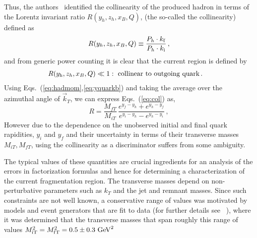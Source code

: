 \documentclass[final,3p,times,onecolumn,sort&compress,hidelinks]{elsarticle}
\newcommand{\xbj}{x_B}
\newcommand{\zh}{z_h}
\newcommand{\Tsc}[2]{#1_{#2\text{T}}}
\newcommand{\initq}{\ensuremath{k_{\rm i}}}
\newcommand{\finalq}{\ensuremath{k_{\rm f}}}
\newcommand{\hady}{\ensuremath{y_{\rm h}}}
\newcommand{\inity}{\ensuremath{y_{\rm i}}}
\newcommand{\finaly}{\ensuremath{y_{\rm f}}}
\newcommand{\ratiocur}{\ensuremath{R}}
\begin{document}
Thus, the authors~\cite{Boglione:2016bph} identified the collinearity of the produced hadron in terms of the Lorentz invariant ratio $R(y_h,z_h,\xbj,Q)$,
(the so-called the collinearity) defined as
\begin{equation}
  R(y_h,z_h,\xbj,Q)\equiv \frac{P_h\cdot \finalq}{P_h\cdot \initq}\, ,
  \label{eq:col}
\end{equation}
and from generic power counting it is clear that the current region is
defined by
\begin{align}
\ratiocur(\hady,\zh,\xbj,Q) \ll 1 &:~ \text{collinear to outgoing quark} \, .
\end{align}
Using Eqs.~(\ref{eq:hadmom},\ref{eq:yquarkb}) and taking the average over the azimuthal angle of
$\vec{k}_T$, we can express Eqs.~(\ref{eq:col}) as,
\begin{equation}
R = \frac{M_{fT}} {M_{iT}}\,\frac{e^{y_f-y_h}+e^{y_h-y_f}} {e^{y_i-y_h}-e^{y_h-y_i}}\,,
\label{eq:colrapid}
\end{equation}
However due to the  dependence on the unobserved 
initial and final quark rapidities, $y_i$ and $y_f$ and their uncertainty in terms of their transverse masses  $M_{iT},  M_{fT}$, using the collinearity as a discriminator suffers from some ambiguity.


The typical values of these quantities are crucial ingredients for an
analysis of the errors in factorization formulas and hence for
determining a characterization of the current fragmentation region.
The transverse masses depend on non-perturbative parameters such as
$k_T$ and the jet and remnant masses. Since such constraints are not well known,
a conservative range of values was motivated by models and event generators that are fit to data (for further details see ~\cite{Boglione:2016bph}), 
where it was determined that the  transverse masses that span roughly this range of values
$\Tsc{M}{\rm i}^2 = \Tsc{M}{\rm f}^2 = 0.5 \pm 0.3~{\rm GeV}^2 $
  
\end{document}
